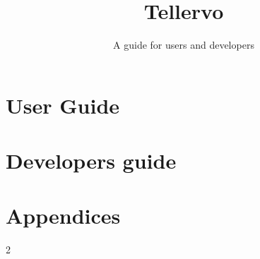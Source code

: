 \documentclass[10pt, twopage headsepline, 8by10]{manual}
\title{Tellervo}
\subtitle{A guide for users and developers}
\begin{document}
  
  

  \part{User Guide}
    
    
    
    
    
    
    
    
    
    
    
    
    
    
    

  \part{Developers guide}
    
    
    
    
    

  \part{Appendices}
    \appendix
    
    
    

    \cleardoublepage
    
    \begin{multicols}{2}
      
    \end{multicols}
    
    \cleardoublepage
    \printindex

\end{document}
